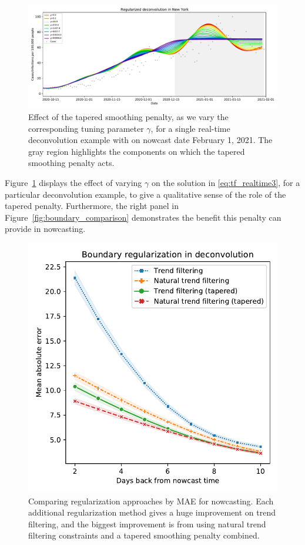 \documentclass[sts]{imsart}
\theoremstyle{plain}
\theoremstyle{definition}
\theoremstyle{remark}
\begin{document}
\begin{figure}[tb]
\centering
\includegraphics[width=0.95\linewidth]{./figures/effect_tapered_ntf.pdf}
\caption{Effect of the tapered smoothing penalty, as we vary the 
corresponding tuning parameter $\gamma$, for a single real-time 
deconvolution example with on nowcast date February 1, 2021. The gray 
region highlights the  components on which the tapered smoothing penalty 
acts.}
\label{fig:tapered_smooth}
\end{figure}

Figure~\ref{fig:tapered_smooth} displays the effect of varying $\gamma$ on the
solution in \eqref{eq:tf_realtime3}, for a particular deconvolution example, to
give a qualitative sense of the role of the tapered penalty. Furthermore, the
right panel in Figure~\ref{fig:boundary_comparison} demonstrates the benefit
this penalty can provide in nowcasting.

\begin{figure}[tb]
\centering
\includegraphics[width=0.825\linewidth]{./figures/tapered_smoothing_03_small_square.pdf}
\caption{Comparing regularization approaches by MAE for nowcasting. Each
  additional regularization method gives a huge improvement on trend filtering,
  and the biggest improvement is from using natural trend filtering constraints
  and a tapered smoothing penalty combined.}      
	\label{fig:extra_reg}
\end{figure}
\end{document}
